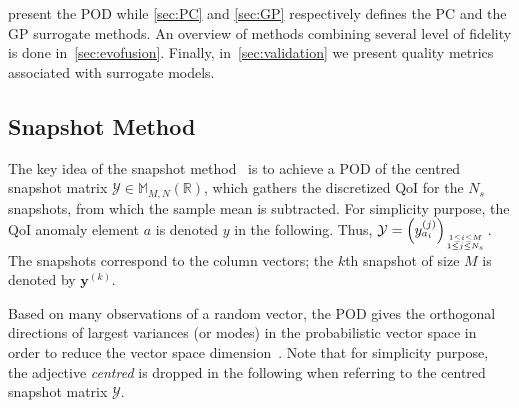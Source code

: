  present the POD while \cref{sec:PC} and \cref{sec:GP} respectively defines the PC and the GP surrogate methods. An overview of methods combining several level of fidelity is done in~\cref{sec:evofusion}. Finally, in~\cref{sec:validation} we present quality metrics associated with surrogate models.


\subsection{Snapshot Method}\label{sec:POD}

The key idea of the snapshot method~\citep{sirovich1987} is to achieve a POD of the centred snapshot matrix $\mathcal{Y} \in \mathbb{M}_{M,N}(\mathbb{R})$, which gathers the discretized QoI for the $N_{s}$ snapshots, from which the sample mean is subtracted. For simplicity purpose, the QoI anomaly element $a$ is denoted $y$ in the following. Thus, $\mathcal{Y} = \left(y_{a_i}^{(j)}\right)_{1\leq i \leq M \atop 1\leq j \leq N_{s}}$. The snapshots correspond to the column vectors; the $k$th snapshot of size $M$ is denoted by $\mathbf{y}^{(k)}$.

Based on many observations of a random vector, the POD gives the orthogonal directions of largest variances (or modes) in the probabilistic vector space in order to reduce the vector space dimension~\citep{chatterjee2000}. Note that for simplicity purpose, the adjective {\it centred} is dropped in the following when referring to the centred snapshot matrix $\mathcal{Y}$.

